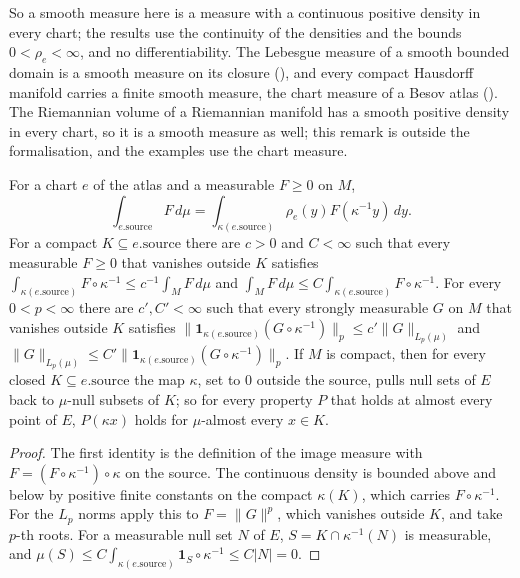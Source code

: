 So a smooth measure here is a measure with a continuous positive density in every chart; the
results use the continuity of the densities and the bounds $0 < \rho_e < \infty$, and no
differentiability. The Lebesgue measure of a smooth bounded domain
is a smooth measure on its closure (), and every compact Hausdorff
manifold carries a finite smooth measure, the chart measure of a Besov atlas
(). The Riemannian volume of a Riemannian manifold has a smooth
positive density in every chart, so it is a smooth measure as well; this remark is outside the
formalisation, and the examples use the chart measure.

\begin{lemma}
\label{lem:chart-integrals}
\leanok
{}
For a chart $e$ of the atlas and a measurable $F \geq 0$ on $M$,
\[
  \int_{e.\mathrm{source}} F \, d\mu = \int_{\kappa(e.\mathrm{source})} \rho_e(y) F(\kappa^{-1} y) \, dy .
\]
For a compact $K \subseteq e.\mathrm{source}$ there are $c > 0$ and $C < \infty$ such that every
measurable $F \geq 0$ that vanishes outside $K$ satisfies
$\int_{\kappa(e.\mathrm{source})} F \circ \kappa^{-1} \leq c^{-1} \int_M F \, d\mu$ and
$\int_M F \, d\mu \leq C \int_{\kappa(e.\mathrm{source})} F \circ \kappa^{-1}$. For every
$0 < p < \infty$ there are $c', C' < \infty$ such that every strongly measurable $G$ on $M$ that
vanishes outside $K$ satisfies
$\|\mathbf 1_{\kappa(e.\mathrm{source})} (G \circ \kappa^{-1})\|_p \leq c' \|G\|_{L_p(\mu)}$ and
$\|G\|_{L_p(\mu)} \leq C' \|\mathbf 1_{\kappa(e.\mathrm{source})} (G \circ \kappa^{-1})\|_p$. If $M$
is compact, then for every closed $K \subseteq e.\mathrm{source}$ the map $\kappa$, set to $0$
outside the source, pulls null sets of $E$ back to $\mu$-null subsets of $K$; so for every property
$P$ that holds at almost every point of $E$, $P(\kappa x)$ holds for $\mu$-almost every $x \in K$.
\end{lemma}

\begin{proof}
\leanok
The first identity is the definition of the image measure with $F = (F \circ \kappa^{-1}) \circ
\kappa$ on the source. The continuous density is bounded above and below by positive finite
constants on the compact $\kappa(K)$, which carries $F \circ \kappa^{-1}$. For the $L_p$ norms
apply this to $F = \|G\|^p$, which vanishes outside $K$, and take $p$-th roots. For a measurable
null set $N$ of $E$, $S = K \cap \kappa^{-1}(N)$ is measurable, and
$\mu(S) \leq C \int_{\kappa(e.\mathrm{source})} \mathbf 1_S \circ \kappa^{-1} \leq C |N| = 0$.
\end{proof}

